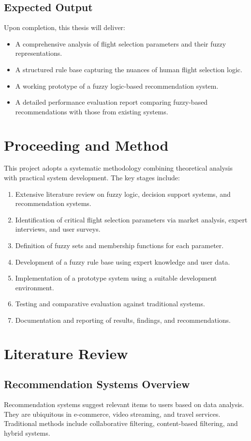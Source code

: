 \documentclass[a4paper]{article}
\begin{document}
\subsection{Expected Output}
Upon completion, this thesis will deliver:
\begin{itemize}
\item A comprehensive analysis of flight selection parameters and their fuzzy representations.
\item A structured rule base capturing the nuances of human flight selection logic.
\item A working prototype of a fuzzy logic-based recommendation system.
\item A detailed performance evaluation report comparing fuzzy-based recommendations with those from existing systems.
\end{itemize}

\section{Proceeding and Method}
This project adopts a systematic methodology combining theoretical analysis with practical system development. The key stages include:
\begin{enumerate}
\item Extensive literature review on fuzzy logic, decision support systems, and recommendation systems.
\item Identification of critical flight selection parameters via market analysis, expert interviews, and user surveys.
\item Definition of fuzzy sets and membership functions for each parameter.
\item Development of a fuzzy rule base using expert knowledge and user data.
\item Implementation of a prototype system using a suitable development environment.
\item Testing and comparative evaluation against traditional systems.
\item Documentation and reporting of results, findings, and recommendations.
\end{enumerate}

\section{Literature Review}
\subsection{Recommendation Systems Overview}
Recommendation systems suggest relevant items to users based on data analysis. They are ubiquitous in e-commerce, video streaming, and travel services. Traditional methods include collaborative filtering, content-based filtering, and hybrid systems.
\end{document}
